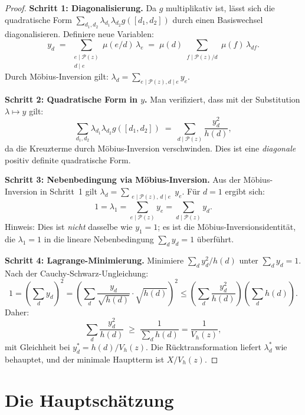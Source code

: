 \documentclass[12pt,a4paper]{amsart}
\theoremstyle{definition}
\begin{document}
\begin{proof}
  \textbf{Schritt 1: Diagonalisierung.}
  Da $g$ multiplikativ ist, lässt sich die quadratische Form
  $\sum_{d_1, d_2} \lambda_{d_1}\lambda_{d_2} g([d_1,d_2])$ durch einen
  Basiswechsel diagonalisieren.  Definiere neue Variablen:
  \[
    y_d \;=\; \sum_{\substack{e \mid \mathcal{P}(z) \\ d \mid e}} \mu(e/d)\, \lambda_e
           \;=\; \mu(d) \sum_{\substack{f \mid \mathcal{P}(z)/d}} \mu(f)\, \lambda_{df}.
  \]
  Durch Möbius-Inversion gilt: $\lambda_d = \sum_{e \mid \mathcal{P}(z), d \mid e} y_e$.

  \textbf{Schritt 2: Quadratische Form in $y$.}
  Man verifiziert, dass mit der Substitution $\lambda \mapsto y$ gilt:
  \[
    \sum_{d_1, d_2} \lambda_{d_1}\lambda_{d_2} g([d_1,d_2])
    \;=\; \sum_{d \mid \mathcal{P}(z)} \frac{y_d^2}{h(d)},
  \]
  da die Kreuzterme durch Möbius-Inversion verschwinden.  Dies ist eine
  \emph{diagonale} positiv definite quadratische Form.

  \textbf{Schritt 3: Nebenbedingung via Möbius-Inversion.}
  Aus der Möbius-Inversion in Schritt~1 gilt $\lambda_d = \sum_{\substack{e \mid \mathcal{P}(z),\, d \mid e}} y_e$.
  Für $d = 1$ ergibt sich:
  \[
    1 = \lambda_1 = \sum_{e \mid \mathcal{P}(z)} y_e = \sum_{d \mid \mathcal{P}(z)} y_d.
  \]
  Hinweis: Dies ist \emph{nicht} dasselbe wie $y_1 = 1$; es ist die Möbius-Inversionsidentität,
  die $\lambda_1 = 1$ in die lineare Nebenbedingung $\sum_d y_d = 1$ überführt.

  \textbf{Schritt 4: Lagrange-Minimierung.}
  Minimiere $\sum_d y_d^2/h(d)$ unter $\sum_d y_d = 1$.  Nach der
  Cauchy-Schwarz-Ungleichung:
  \[
    1 = \left(\sum_d y_d\right)^2
    = \left(\sum_d \frac{y_d}{\sqrt{h(d)}} \cdot \sqrt{h(d)}\right)^2
    \leq \left(\sum_d \frac{y_d^2}{h(d)}\right)\left(\sum_d h(d)\right).
  \]
  Daher:
  \[
    \sum_d \frac{y_d^2}{h(d)} \;\geq\; \frac{1}{\sum_d h(d)} = \frac{1}{V_h(z)},
  \]
  mit Gleichheit bei $y_d^* = h(d) / V_h(z)$.  Die Rücktransformation liefert
  $\lambda_d^*$ wie behauptet, und der minimale Hauptterm ist $X/V_h(z)$.
\end{proof}

\section{Die Hauptschätzung}
\label{sec:hauptschaetzung}
\end{document}

